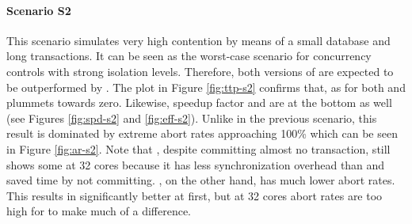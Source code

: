 \paragraph{Scenario S2}


This scenario simulates very high contention by means of a small database and
long transactions. It can be seen as the worst-case scenario for concurrency
controls with strong isolation levels. Therefore, both versions of \midas are
expected to be outperformed by \echo. The plot in Figure \ref{fig:ttp-s2}
confirms that, as \ttp for both \midas and \midasopt plummets towards zero.
Likewise, speedup factor and \eff are at the bottom as well (see Figures
\ref{fig:spd-s2} and \ref{fig:eff-s2}). Unlike in the previous scenario, this
result is dominated by extreme abort rates approaching 100\% which can be seen
in Figure \ref{fig:ar-s2}. Note that \midasopt, despite committing almost no
transaction, still shows some \tput at 32 cores because it has less
synchronization overhead than \midas and saved time by not committing. \echo, on
the other hand, has much lower abort rates. This results in significantly better
\ttp at first, but at 32 cores abort rates are too high for \echo to make much
of a difference.

